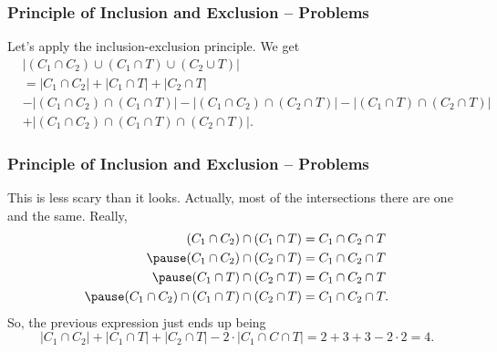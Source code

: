 \documentclass[aspectratio=169,11pt,usenames,dvipsnames]{beamer}
\begin{document}
\begin{frame}
 \frametitle{Principle of Inclusion and Exclusion -- Problems}
 Let's apply the inclusion-exclusion principle. We get
 \begin{align*}
  &|(C_1 \cap C_2) \cup (C_1 \cap T) \cup (C_2 \cup T)| \\
  &= |C_1 \cap C_2| + |C_1 \cap T| + |C_2 \cap T| \\
                                                       &- |(C_1 \cap C_2) \cap
                                                       (C_1 \cap T)| - |(C_1
                                                       \cap C_2) \cap (C_2 \cap
                                                       T)| 
                                                       - |(C_1 \cap T) \cap
                                                       (C_2 \cap T)| \\
                                                       &+ |(C_1 \cap C_2) \cap
                                                       (C_1 \cap T) \cap (C_2
                                                       \cap T)|.
 \end{align*}
\end{frame}

\begin{frame}
 \frametitle{Principle of Inclusion and Exclusion -- Problems}
 This is less scary than it looks. Actually, most of the intersections there are
 one and the same. Really,
 \begin{align*}
  (C_1 \cap C_2) \cap (C_1 \cap T) &= C_1 \cap C_2 \cap T \\
  \pause
  (C_1 \cap C_2) \cap (C_2 \cap T) &= C_1 \cap C_2 \cap T \\
  \pause
  (C_1 \cap T) \cap (C_2 \cap T) &= C_1 \cap C_2 \cap T \\
  \pause
  (C_1 \cap C_2) \cap (C_1 \cap T) \cap (C_2 \cap T) &= C_1 \cap C_2 \cap T.
 \end{align*}
 \pause
 So, the previous expression just ends up being
 \[
  |C_1 \cap C_2| + |C_1 \cap T| + |C_2 \cap T| - 2 \cdot |C_1 \cap C \cap T| = 2
  + 3 + 3 - 2 \cdot 2 = 4.
 \]
 
\end{frame}
\end{document}
